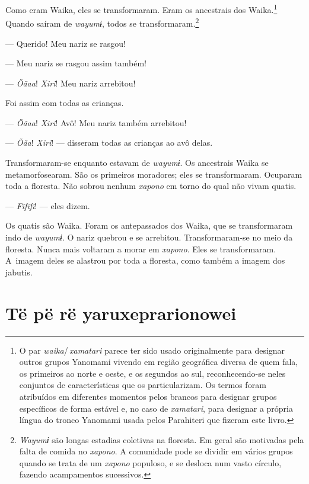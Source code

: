 Como eram Waika, eles se transformaram. Eram os ancestrais dos Waika.\footnote{O par \textit{waika}/\,\textit{xamatari} parece ter sido usado originalmente para designar outros grupos Yanomami vivendo em região geográfica diversa de quem fala, os primeiros ao norte e oeste, e os segundos ao sul, reconhecendo-se neles conjuntos de características que os particularizam. Os termos foram atribuídos em diferentes momentos pelos brancos para designar grupos específicos de forma estável e, no caso de \textit{xamatari}, para designar a própria língua do tronco Yanomami usada pelos Parahiteri que fizeram este livro.} Quando saíram de \textit{wayumɨ}, todos se transformaram.\footnote{\textit{Wayumɨ} são longas estadias coletivas na floresta. Em geral são motivadas pela falta de comida no \textit{xapono}. A comunidade pode se dividir em vários grupos quando se trata de um \textit{xapono} populoso, e se desloca num vasto círculo, fazendo acampamentos sucessivos.} 

--- Querido! Meu nariz se rasgou! 

--- Meu nariz se rasgou assim também!

--- \textit{Õãaa}! \textit{Xiri}! Meu nariz arrebitou! 

Foi assim com todas as crianças. 

--- \textit{Õãaa}! \textit{Xiri}! Avô! Meu nariz também arrebitou! 

--- \textit{Õãa}! \textit{Xiri}! --- disseram todas as crianças ao avô delas. 

Transformaram-se enquanto estavam de \textit{wayumɨ}. Os ancestrais Waika
se metamorfosearam. São os primeiros moradores; eles se transformaram.
Ocuparam toda a floresta. Não sobrou nenhum \textit{xapono} em torno do qual não
vivam quatis. 


--- \textit{Fĩfĩfĩ}! --- eles dizem. 

Os quatis são Waika. Foram os antepassados dos Waika, que se
transformaram indo de \textit{wayumɨ}. O nariz quebrou e se arrebitou.
Transformaram-se no meio da floresta. Nunca mais voltaram a morar em
\textit{xapono}. Eles se transformaram. A~imagem deles se alastrou por toda a
floresta, como também a imagem dos jabutis.

\chapter{Të pë rë yaruxeprarionowei}

